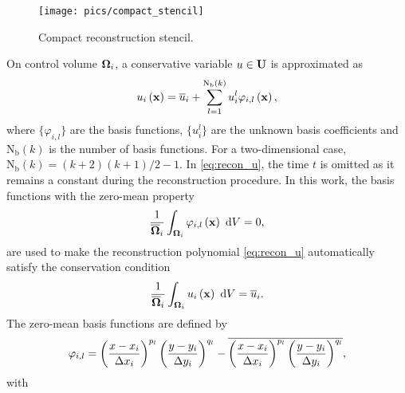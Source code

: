 \begin{figure}[htbp!]
    \centering
    \texttt{[image: pics/compact\_stencil]}
    \caption{Compact reconstruction stencil.}
    \label{fig:compactstencil}
\end{figure}

On control volume $\mathbf{\Omega}_i$, a conservative variable $u \in \mathbf{U}$ is approximated as
\begin{equation}
    \label{eq:recon_u}
    u_i \left(\mathbf{x}\right)= \overline{u}_i + \sum^{\mathrm{N_b}\left(k\right)}_{l=1} u_i^l \varphi_{i,l} \left(\mathbf{x}\right),
\end{equation}
where $\{\varphi_{i,l}\}$ are the basis functions, $\{u^l_i\}$ are the unknown basis coefficients and $\mathrm{N_b}(k)$ is the number of basis functions. For a two-dimensional case, $\mathrm{N_b}(k)=  (k+2)(k+1)/2 -1$. In \eqref{eq:recon_u}, the time $t$ is omitted as it remains a constant during the reconstruction procedure.
In this work, the basis functions with the zero-mean property
\begin{equation}
    \frac{1}{\overline{\mathbf{\Omega}}_i} \int_{\mathbf{\Omega}_i} \varphi_{i,l} \left(\mathbf{x}\right) \ \dd V=0,
\end{equation}
are used to make the reconstruction polynomial \eqref{eq:recon_u} automatically satisfy the conservation condition
\begin{equation}
    \label{eq:zero-mean}
    \frac{1}{\overline{\mathbf{\Omega}}_i}\int_{\mathbf{\Omega}_i}u_i \left(\mathbf{x}\right)\ \dd V= \overline{u}_i.
\end{equation}
The zero-mean basis functions are defined by
\begin{equation}
    \varphi_{i,l} =
    \left(\frac{x - x_{i}}{\mathrm\Delta x_i}\right)^{p_l}
    \left(\frac{y - y_{i}}{\mathrm\Delta y_i}\right)^{q_l}
    -
    \overline{
        \left(\frac{x - x_{i}}{\mathrm\Delta x_i}\right)^{p_l}
        \left(\frac{y - y_{i}}{\mathrm\Delta y_i}\right)^{q_l}
    },
\end{equation}
with

